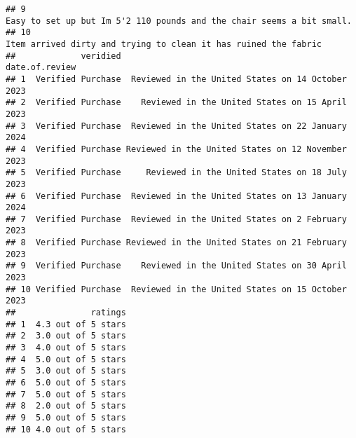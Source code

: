 \documentclass[
]{article}
\begin{document}
\begin{verbatim}
## 9                                                                                                                                                                                                                                                                                                                                                                                                                                                                                                                                                                                                                                                                                                                                                                                                                      Easy to set up but Im 5'2 110 pounds and the chair seems a bit small.
## 10                                                                                                                                                                                                                                                                                                                                                                                                                                                                                                                                                                                                                                                                                                                                                                                                                           Item arrived dirty and trying to clean it has ruined the fabric
##             veridied                                    date.of.review
## 1  Verified Purchase  Reviewed in the United States on 14 October 2023
## 2  Verified Purchase    Reviewed in the United States on 15 April 2023
## 3  Verified Purchase  Reviewed in the United States on 22 January 2024
## 4  Verified Purchase Reviewed in the United States on 12 November 2023
## 5  Verified Purchase     Reviewed in the United States on 18 July 2023
## 6  Verified Purchase  Reviewed in the United States on 13 January 2024
## 7  Verified Purchase  Reviewed in the United States on 2 February 2023
## 8  Verified Purchase Reviewed in the United States on 21 February 2023
## 9  Verified Purchase    Reviewed in the United States on 30 April 2023
## 10 Verified Purchase  Reviewed in the United States on 15 October 2023
##               ratings
## 1  4.3 out of 5 stars
## 2  3.0 out of 5 stars
## 3  4.0 out of 5 stars
## 4  5.0 out of 5 stars
## 5  3.0 out of 5 stars
## 6  5.0 out of 5 stars
## 7  5.0 out of 5 stars
## 8  2.0 out of 5 stars
## 9  5.0 out of 5 stars
## 10 4.0 out of 5 stars
\end{verbatim}
\end{document}
